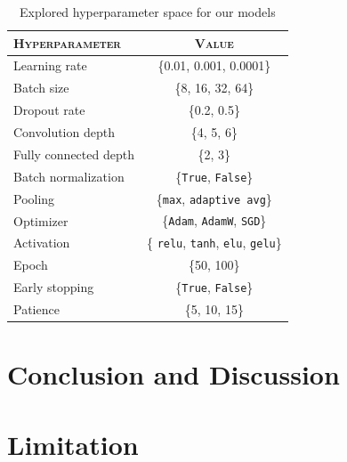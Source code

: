 \begin{table}[ht]
  \centering
  \begin{tabular}{@{}lc@{}}
    \toprule
    \textsc{Hyperparameter} & \textsc{Value} \\
    \midrule
    Learning rate & \{0.01, 0.001, 0.0001\}  \\
    Batch size & \{8, 16, 32, 64\} \\
    Dropout rate & \{0.2, 0.5\} \\
    Convolution depth & \{4, 5, 6\} \\
    Fully connected depth & \{2, 3\} \\
    Batch normalization & \{\texttt{True}, \texttt{False}\} \\
    Pooling & \{\texttt{max}, \texttt{adaptive avg}\} \\
    Optimizer & \{\texttt{Adam}, \texttt{AdamW}, \texttt{SGD}\} \\
    Activation & \{ \texttt{relu}, \texttt{tanh}, \texttt{elu}, \texttt{gelu}\} \\
    Epoch & \{50, 100\} \\
    Early stopping & \{\texttt{True}, \texttt{False}\} \\
    Patience & \{5, 10, 15\} \\
    \bottomrule
  \end{tabular}
  \caption{Explored hyperparameter space for our models}
  \label{tab:hyper}
\end{table}

\section{Conclusion and Discussion}
\label{sec:conclusion}

\section{Limitation}
\label{sec:limitation}

\newpage
